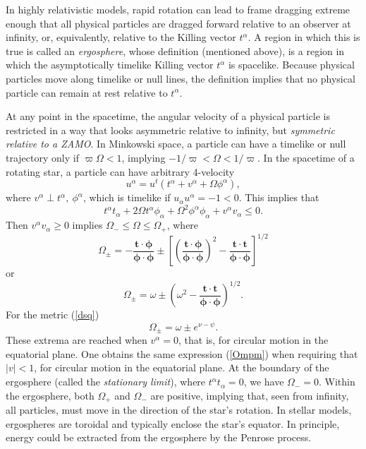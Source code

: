 \documentclass[12pt]{article}
\def\be{\begin{equation}}
\def\ee{\end{equation}}
\begin{document}
\vskip0.8cm

  
In highly relativistic models, rapid rotation can lead to frame dragging 
extreme enough that all physical particles are dragged forward relative to an observer at infinity, or, equivalently, relative to the Killing vector 
$t^\alpha$.  A region in which this is true is called an {\em ergosphere}, 
whose definition (mentioned above), is a region in which the 
asymptotically timelike Killing vector $t^\alpha$ is spacelike.  
Because physical particles move along timelike or null lines, the 
definition implies that no physical particle 
can remain at rest relative to $t^\alpha$.  

At any point in the spacetime, the angular velocity of a physical 
particle is restricted in a way that looks asymmetric relative to 
infinity, but \textit{symmetric relative to a ZAMO}.  In Minkowski space, a particle
can have a timelike or null trajectory only if $\varpi\Omega < 1$,
implying $-1/\varpi < \Omega < 1/\varpi$.  In the spacetime of a rotating star, a particle can have arbitrary 4-velocity 
\[
  u^\alpha 
=   u^t(t^\alpha  +   v^\alpha + \Omega \phi^\alpha 
       ),
\]
where $  v^\alpha \perp t^\alpha, \ \phi^\alpha$, which is timelike if  $  u_\alpha   u^\alpha = -1<0.$ This implies that 
\[ 
        t^\alpha t_\alpha + 2 \Omega t^\alpha\phi_\alpha 
        +   \Omega^2\phi^\alpha\phi_\alpha +   v^\alpha
 v_\alpha \leq 0.
\]
Then $   v^\alpha   v_\alpha \geq 0$ implies  
$ \Omega _- \leq   \Omega \leq \Omega _+$, where
\[\Omega _{\pm} 
    = - \bm { \frac{t\cdot \phi }{\bm \phi\cdot\phi } } 
        \pm  \left[\left(\bm{ \frac{ t\cdot\phi }{\phi\cdot \phi} }\right)^2 
                        -\bm{ \frac{t\cdot t }{\phi\cdot\phi}} \right]^{1/2}
\]
or
\be
  \Omega _{\pm} 
        = \omega \pm \left(\omega^2 
        - \bm{ \frac{ t\cdot t }{\phi\cdot\phi}}\right)^{1/2}. 
\ee
For the metric (\ref{dsq})
\begin{equation}
\Omega_{\pm}    =       \omega \pm e^{\nu-\psi}.
\label{Ompm}
\end{equation}
These extrema are reached when $  v^\alpha = 0$, that is, for 
circular motion in the equatorial plane. One obtains the same expression
(\ref{Ompm}) when requiring that $|v|<1$, for
circular motion in the equatorial plane.
At the boundary of the ergosphere (called the {\em stationary limit}), 
where $t^\alpha t_\alpha=0$, we have $\Omega_- = 0$.  Within the ergosphere, 
both $\Omega_+$ and $\Omega_-$ are positive, implying that, seen from 
infinity, all particles, must move in the direction of the star's rotation.
In stellar models, ergospheres are toroidal and typically enclose the star's 
equator. In principle, energy could be extracted from the ergosphere by the Penrose process.       
   
\end{document}
